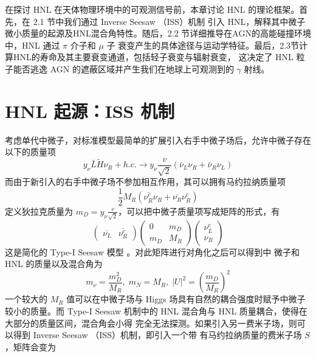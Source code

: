 \documentclass[printMode=false, declarePage=false]{ecnuthesis}
\begin{document}
在探讨 HNL 在天体物理环境中的可观测信号前，本章讨论 HNL 的理论框架。首先，在 2.1 节中我们通过 Inverse Seesaw （ISS）机制
引入 HNL，解释其中微子微小质量的起源及HNL混合角特性。随后，2.2 节详细推导在AGN的高能碰撞环境中，HNL 通过 $\pi$ 介子和 $\mu$ 子
衰变产生的具体途径与运动学特征。最后，2.3节计算HNL的寿命及其主要衰变通道，包括轻子衰变与辐射衰变，
这决定了 HNL 粒子能否逃逸 AGN 的遮蔽区域并产生我们在地球上可观测到的 $\gamma$ 射线。

\section{HNL 起源：ISS 机制}

考虑单代中微子，对标准模型最简单的扩展引入右手中微子场后，允许中微子存在以下的质量项
\begin{equation}
  y_\nu \bar{L} \tilde{H} \nu_R + h.c. \to y_\nu \frac{v}{\sqrt{2}} (\bar{\nu}_L \nu_R + \bar{\nu}_R \nu_L)
\end{equation}
而由于新引入的右手中微子场不参加相互作用，其可以拥有马约拉纳质量项
\begin{equation}
  \frac{1}{2} M_R (\overline{\nu^c_R} \nu_R + \overline{\nu_R} \nu_R^c) 
\end{equation}
定义狄拉克质量为 $m_D = y_\nu \frac{v}{\sqrt{2}}$，可以把中微子质量项写成矩阵的形式，有
\begin{equation}
  \begin{pmatrix}
    \overline{\nu_L} & \overline{\nu_R^c}
  \end{pmatrix}
  \begin{pmatrix}
    0   & m_D  \\
    m_D & M_R
  \end{pmatrix}
  \begin{pmatrix}
    \nu_L^c \\
    \nu_R
  \end{pmatrix}
\end{equation}
这是简化的 Type-I Seesaw 模型 \cite{king2025righthandedneutrinosseesawmodels}。对此矩阵进行对角化之后可以得到中
微子和 HNL 的质量以及混合角为
\begin{equation}
  m_\nu = \frac{m_D^2}{M_R}, \; m_N = M_R, \; |U|^2 = \left( \frac{m_D}{M_R} \right)^2
\end{equation}
一个较大的 $M_R$ 值可以在中微子场与 Higgs 场具有自然的耦合强度时赋予中微子较小的质量。而
Type-I Seesaw 机制中的 HNL 混合角与 HNL 质量耦合，使得在大部分的质量区间，混合角会小得
完全无法探测。如果引入另一费米子场，则可以得到 Inverse Seesaw （ISS）机制，即引入一个带
有马约拉纳质量的费米子场 $S$，矩阵会变为
\end{document}
